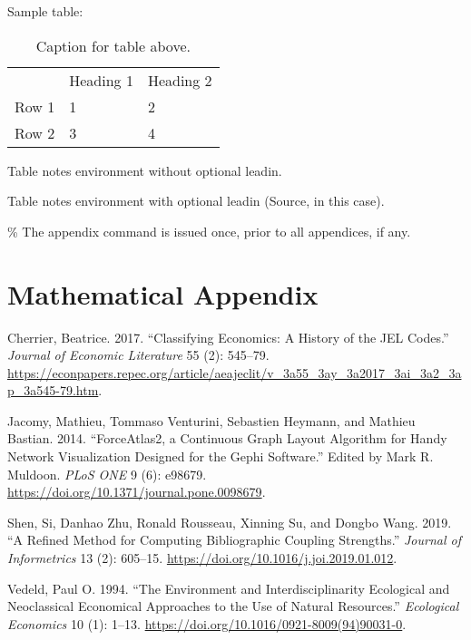 \documentclass[JEL]{AEA}
\newlength{\cslhangindent}
\newlength{\cslentryspacingunit} %
\newenvironment{CSLReferences}[2] %
 {%
  \setlength{\parindent}{0pt}
  \ifodd #1
  \let\oldpar\par
  \def\par{\hangindent=\cslhangindent\oldpar}
  \fi
  \setlength{\parskip}{#2\cslentryspacingunit}
 }%
 {}
\begin{document}
Sample table:

\begin{table}
\caption{Caption for table above.}

\begin{tabular}{lll}
& Heading 1 & Heading 2 \\
Row 1 & 1 & 2 \\
Row 2 & 3 & 4%
\end{tabular}
\begin{tablenotes}
Table notes environment without optional leadin.
\end{tablenotes}
\begin{tablenotes}[Source]
Table notes environment with optional leadin (Source, in this case).
\end{tablenotes}
\end{table}

\% The appendix command is issued once, prior to all appendices, if any.
\appendix

\section{Mathematical Appendix}

\hypertarget{refs}{}
\begin{CSLReferences}{1}{0}
\leavevmode{}%
Cherrier, Beatrice. 2017. {``Classifying {Economics}: {A History} of the
{JEL Codes}.''} \emph{Journal of Economic Literature} 55 (2): 545--79.
\url{https://econpapers.repec.org/article/aeajeclit/v_3a55_3ay_3a2017_3ai_3a2_3ap_3a545-79.htm}.

\leavevmode{}%
Jacomy, Mathieu, Tommaso Venturini, Sebastien Heymann, and Mathieu
Bastian. 2014. {``{ForceAtlas2}, a {Continuous Graph Layout Algorithm}
for {Handy Network Visualization Designed} for the {Gephi Software}.''}
Edited by Mark R. Muldoon. \emph{PLoS ONE} 9 (6): e98679.
\url{https://doi.org/10.1371/journal.pone.0098679}.

\leavevmode{}%
Shen, Si, Danhao Zhu, Ronald Rousseau, Xinning Su, and Dongbo Wang.
2019. {``A Refined Method for Computing Bibliographic Coupling
Strengths.''} \emph{Journal of Informetrics} 13 (2): 605--15.
\url{https://doi.org/10.1016/j.joi.2019.01.012}.

\leavevmode{}%
Vedeld, Paul O. 1994. {``The Environment and Interdisciplinarity
Ecological and Neoclassical Economical Approaches to the Use of Natural
Resources.''} \emph{Ecological Economics} 10 (1): 1--13.
\url{https://doi.org/10.1016/0921-8009(94)90031-0}.

\end{CSLReferences}
\end{document}
